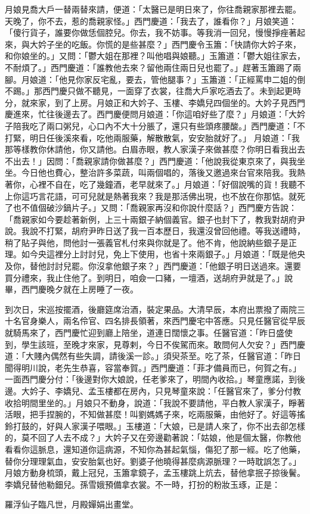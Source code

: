 月娘見喬大戶一替兩替來請，便道：「太醫已是明日來了，你往喬親家那裡去罷。天晚了，你不去，惹的喬親家怪。」西門慶道：「我去了，誰看你？」月娘笑道： 「傻行貨子，誰要你做恁個腔兒。你去，我不妨事。等我消一回兒，慢慢掙痤著起來，與大妗子坐的吃飯。你慌的是些甚麼？」西門慶令玉簫：「快請你大妗子來，和你娘坐的。」又問：「鬱大姐在那裡？叫他唱與娘聽。」玉簫道：「鬱大姐往家去，不耐煩了。」西門慶道：「誰教他去來？留他兩住兩日兒也罷了。」趕著玉簫踢了兩腳。月娘道：「他見你家反宅亂，要去，管他腿事？」玉簫道：「正經罵申二姐的倒不踢。」那西門慶只做不聽見，一面穿了衣裳，往喬大戶家吃酒去了。未到起更時分，就來家，到了上房。月娘正和大妗子、玉樓、李嬌兒四個坐的。大妗子見西門慶進來，忙往後邊去了。西門慶便問月娘道：「你這咱好些了麼？」月娘道：「大妗子陪我吃了兩口粥兒，心口內不大十分脹了，還只有些頭疼腰酸。」西門慶道：「不打緊，明日任後溪來看，吃他兩服藥，解散散氣，安安胎就好了。」 月娘道：「我那等樣教你休請他，你又請他。白眉赤眼，教人家漢子來做甚麼？你明日看我出去不出去！」因問：「喬親家請你做甚麼？」西門慶道：「他說我從東京來了，與我坐坐。今日他也費心，整治許多菜蔬，叫兩個唱的，落後又邀過來台官來陪我。我熱著你，心裡不自在，吃了幾鐘酒，老早就來了。」月娘道：「好個說嘴的貨！我聽不上你這巧言花語，可可兒就是熱著我來？我是那活佛出現，也不放在你那惦。就死了也不值個破沙鍋片子。」又問：「喬親家再沒和你說什麼話？」西門慶方告說：「喬親家如今要趁著新例，上三十兩銀子納個義官。銀子也封下了，教我對胡府尹說。我說不打緊，胡府尹昨日送了我一百本歷日，我還沒曾回他禮。等我送禮時，稍了貼子與他，問他討一張義官札付來與你就是了。他不肯，他說納些銀子是正理。如今央這裡分上討討兒，免上下使用，也省十來兩銀子。」月娘道：「既是他央及你，替他討討兒罷。你沒拿他銀子來？」西門慶道：「他銀子明日送過來。還要買分禮來，我止住他了。到明日，咱僉一口豬，一壇酒，送胡府尹就是了。」說畢，西門慶晚夕就在上房睡了一夜。

到次日，宋巡按擺酒，後廳筵席治酒，裝定果品。大清早辰，本府出票撥了兩院三十名官身樂人，兩名伶官、四名排長領著，來西門慶宅中答應。只見任醫官從早辰就騎馬來了，西門慶忙迎到廳上陪坐，道連日闊懷之事。任醫官道：「昨日盛使到，學生該班，至晚才來家，見尊剌，今日不俟駕而來。敢問何人欠安？」西門慶道：「大賤內偶然有些失調，請後溪一診。」須臾茶至。吃了茶，任醫官道：「昨日聞得明川說，老先生恭喜，容當奉賀。」西門慶道：「菲才備員而已，何賀之有。」一面西門慶分付：「後邊對你大娘說，任老爹來了，明間內收拾。」琴童應諾，到後邊。大妗子、李嬌兒、孟玉樓都在房內，只見琴童來說：「任醫官來了，爹分付教收拾明間里坐的。」月娘只不動身，說道：「我說不要請他，平白教人家漢子，睜著活眼，把手捏腕的，不知做甚麼！叫劉媽媽子來，吃兩服藥，由他好了。好這等搖鈴打鼓的，好與人家漢子喂眼。」玉樓道：「大娘，已是請人來了，你不出去卻怎樣的，莫不回了人去不成？」大妗子又在旁邊勸著說：「姑娘，他是個太醫，你教他看看你這脈息，還知道你這病源，不知你為甚起氣惱，傷犯了那一經。吃了他藥，替你分理理氣血，安安胎氣也好。劉婆子他曉得甚麼病源脈理？一時耽誤怎了。」月娘方動身梳頭，戴上冠兒，玉簫拿鏡子，孟玉樓跳上炕去，替他拿抿子掠後鬢。李嬌兒替他勒鈿兒。孫雪娥預備拿衣裳。不一時，打扮的粉妝玉琢，正是：

羅浮仙子臨凡世，月殿嬋娟出畫堂。

